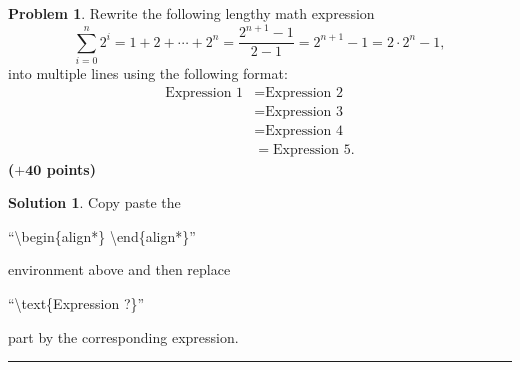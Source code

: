 \documentclass{article}
\theoremstyle{definition}
\newtheorem{problem}{Problem}
\def\fline{\rule{0.75\linewidth}{0.5pt}}
\newcommand{\finishline}{\begin{center}\fline\end{center}}
\newtheorem*{solution*}{Solution}
\newenvironment{solution}{\begin{solution*}}{{\finishline} \end{solution*}}
\newcommand{\grade}[1]{\hfill{\textbf{($\mathbf{#1}$ points)}}}
\begin{document}
\begin{problem}
	Rewrite the following lengthy math expression
	\[
		\sum_{i=0}^{n} 2^i = 1 + 2 + \cdots + 2^n = \frac{2^{n+1}-1}{2-1} = 2^{n+1}-1 = 2 \cdot 2^n - 1,
	\]
	into multiple lines using the following format:
	\begin{align*}
		\text{Expression 1} &= \text{Expression 2} \\
		&= \text{Expression 3} \\
		&= \text{Expression 4} \\
		&= \text{Expression 5}. 
	\end{align*}   \grade{+40} 
\end{problem}

\begin{solution} 
	Copy paste the
	
	 ``\textbackslash begin\{align*\} \textbackslash end\{align*\}'' 
	 
	 environment above and then replace  
	
	``\textbackslash text\{Expression ?\}'' 
	
	part by the corresponding expression. 
\end{solution}
\end{document}
